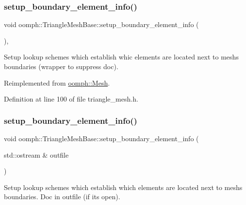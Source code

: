 \subsubsection{\texorpdfstring{setup\+\_\+boundary\+\_\+element\+\_\+info()}{setup\_boundary\_element\_info()}\hspace{0.1cm}{\footnotesize\ttfamily [1/2]}}
{\footnotesize\ttfamily void oomph\+::\+Triangle\+Mesh\+Base\+::setup\+\_\+boundary\+\_\+element\+\_\+info (\begin{DoxyParamCaption}{ }\end{DoxyParamCaption})\hspace{0.3cm}{\ttfamily [inline]}, {\ttfamily [virtual]}}

Setup lookup schemes which establish whic elements are located next to mesh\textquotesingle{}s boundaries (wrapper to suppress doc). 

Reimplemented from \hyperlink{classoomph_1_1Mesh_a6cc8bcd6b41209f0e9295cc993d9c6bb}{oomph\+::\+Mesh}.



Definition at line 100 of file triangle\+\_\+mesh.\+h.

\mbox{\label{classoomph_1_1TriangleMeshBase_a187fd9dbc558b9d19a02d92ce876507c}} 
\subsubsection{\texorpdfstring{setup\+\_\+boundary\+\_\+element\+\_\+info()}{setup\_boundary\_element\_info()}\hspace{0.1cm}{\footnotesize\ttfamily [2/2]}}
{\footnotesize\ttfamily void oomph\+::\+Triangle\+Mesh\+Base\+::setup\+\_\+boundary\+\_\+element\+\_\+info (\begin{DoxyParamCaption}\item[{std\+::ostream \&}]{outfile }\end{DoxyParamCaption})\hspace{0.3cm}{\ttfamily [virtual]}}



Setup lookup schemes which establish which elements are located next to mesh\textquotesingle{}s boundaries. Doc in outfile (if it\textquotesingle{}s open). 

